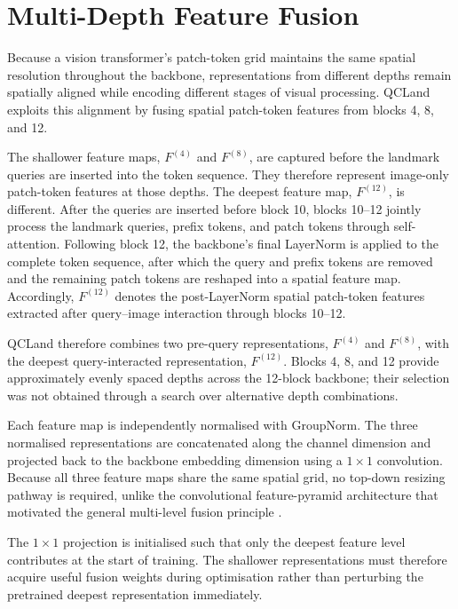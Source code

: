 
\section{Multi-Depth Feature Fusion}
\label{sec:method-fusion}

Because a vision transformer's patch-token grid maintains the same
spatial resolution throughout the backbone, representations from
different depths remain spatially aligned while encoding different
stages of visual processing. QCLand exploits this alignment by fusing
spatial patch-token features from blocks 4, 8, and 12.

The shallower feature maps, $F^{(4)}$ and $F^{(8)}$, are captured
before the landmark queries are inserted into the token sequence.
They therefore represent image-only patch-token features at those
depths. The deepest feature map, $F^{(12)}$, is different. After the
queries are inserted before block 10, blocks 10--12 jointly process
the landmark queries, prefix tokens, and patch tokens through
self-attention. Following block 12, the backbone's final LayerNorm is
applied to the complete token sequence, after which the query and
prefix tokens are removed and the remaining patch tokens are reshaped
into a spatial feature map. Accordingly, $F^{(12)}$ denotes the
post-LayerNorm spatial patch-token features extracted after
query--image interaction through blocks 10--12.

QCLand therefore combines two pre-query representations,
$F^{(4)}$ and $F^{(8)}$, with the deepest query-interacted
representation, $F^{(12)}$. Blocks 4, 8, and 12 provide approximately
evenly spaced depths across the 12-block backbone; their selection was
not obtained through a search over alternative depth combinations.

Each feature map is independently normalised with GroupNorm. The three
normalised representations are concatenated along the channel
dimension and projected back to the backbone embedding dimension using
a $1 \times 1$ convolution. Because all three feature maps share the
same spatial grid, no top-down resizing pathway is required, unlike
the convolutional feature-pyramid architecture that motivated the
general multi-level fusion principle \parencite{lin2017fpn}.

The $1 \times 1$ projection is initialised such that only the deepest
feature level contributes at the start of training. The shallower
representations must therefore acquire useful fusion weights during
optimisation rather than perturbing the pretrained deepest
representation immediately.


